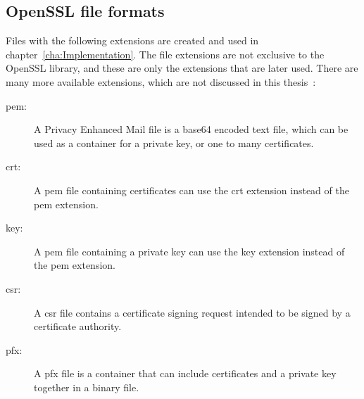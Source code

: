 \subsection{OpenSSL file formats}
Files with the following extensions are created and used in chapter~\ref{cha:Implementation}.
The file extensions are not exclusive to the OpenSSL library, and these are only the extensions that are later used.
There are many more available extensions, which are not discussed in this thesis~\cite{opensslextensions, viega2002network}:
\begin{description}
    \item[pem:] A Privacy Enhanced Mail file is a base64 encoded text file, which can be used as a container for a private key, or one to many certificates.
    \item[crt:] A pem file containing certificates can use the crt extension instead of the pem extension.
    \item[key:] A pem file containing a private key can use the key extension instead of the pem extension.
    \item[csr:] A csr file contains a certificate signing request intended to be signed by a certificate authority.
    \item[pfx:] A pfx file is a container that can include certificates and a private key together in a binary file.
\end{description}
